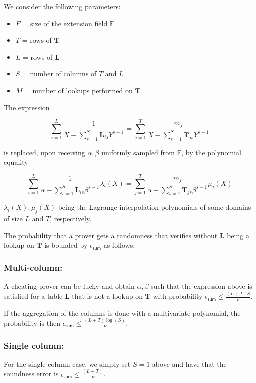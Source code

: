 We consider the following parameters:
\begin{itemize}
	\item $F$ = size of the extension field $\mathbb{F}$
	\item $T$ = rows of $\mathbf{T}$
	\item $L$ = rows of $\mathbf{L}$
	\item $S$ = number of columns of $T$ and $L$
	\item $M$ = number of lookups performed on $\mathbf{T}$
\end{itemize}


The expression 

$$\sum_{i=1}^L \frac{1}{X- \sum_{s=1}^S \mathbf L_{is}Y^{s-1}}=\sum_{j=1}^T \frac{m_j}{X-\sum_{s=1}^S \mathbf T_{js}Y^{s-1}}$$

is replaced, upon receiving $\alpha, \beta$ uniformly sampled from $\mathbb{F}$, by the polynomial equality  

$$\sum_{i=1}^L \frac{1}{\alpha- \sum_{s=1}^S \mathbf L_{is}\beta^{s-1}}\lambda_i(X)=\sum_{j=1}^T \frac{m_j}{\alpha-\sum_{s=1}^S \mathbf T_{js}\beta^{s-1}}\mu_j(X)$$

$\lambda_i(X), \mu_j(X)$ being the Lagrange interpolation polynomials of some domains of size $L$ and $T$, respectively.


The probability that a prover gets a randomness that verifies without $\mathbf L$ being a lookup on $\mathbf{T}$ is bounded by $\epsilon_{\mathsf{sum}}$ as follows:


\subsubsection{Multi-column:}


A cheating prover can be lucky and obtain $\alpha, \beta$ such that the expression above is satisfied for a table $\mathbf {L}$ that is not a lookup on $\mathbf{T}$ with probability  $\epsilon_{\mathsf{sum}}\leq \frac{(L+T)S}{F}$.

If the aggregation of the columns is done with a multivariate polynomial, the probability is then  $\epsilon_{\mathsf{sum}}\leq \frac{(L+T)\log(S)}{F}$.



\subsubsection{Single column:}

For the single column case, we simply set $S=1$ above and have that the soundness error is $\epsilon_{\mathsf{sum}}\leq \frac{(L+T)}{F}$.




